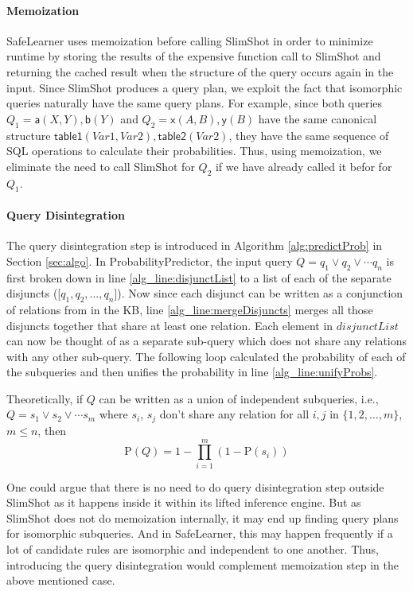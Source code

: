 \documentclass[akbc,twoside,11pt]{article}
\newcounter{example}
\newcommand{\arcchit}[1]{\textcolor{red}{A: {#1}}}
\newcommand{\algorithmname}{SafeLearner\xspace}
\begin{document}
\paragraph{Memoization}
\algorithmname uses memoization before calling SlimShot in order to minimize runtime by storing the results of the expensive function call to SlimShot and returning the cached result when the structure of the query occurs again in the input. Since SlimShot produces a query plan, we exploit the fact that isomorphic queries naturally have the same query plans. For example, since both queries $Q_1 = \mathsf{a}(X,Y),\mathsf{b}(Y)$ and $Q_2 = \mathsf{x}(A,B), \mathsf{y}(B)$ have the same canonical structure $\mathsf{table1}(Var1, Var2), \mathsf{table2}(Var2)$, they have the same sequence of SQL operations to calculate their probabilities. Thus, using memoization, we eliminate the need to call SlimShot for $Q_2$ if we have already called it befor for $Q_1$. 

\paragraph{Query Disintegration} 
The query disintegration step is introduced in Algorithm \ref{alg:predictProb} in Section \ref{sec:algo}. In ProbabilityPredictor, the input query $Q = q_1 \vee q_2 \vee \cdots q_n$ is first broken down in line \ref{alg_line:disjunctList} to a list of each of the separate disjuncts ([$q_1, q_2, \ldots , q_n$]). Now since each disjunct can be written as a conjunction of relations from in the KB, line \ref{alg_line:mergeDisjuncts} merges all those disjuncts together that share at least one relation. Each element in $disjunctList$ can now be thought of as a separate sub-query which does not share any relations with any other sub-query. The following loop calculated the probability of each of the subqueries and then unifies the probability in line \ref{alg_line:unifyProbs}.

Theoretically, if $Q$ can be written as a union of independent subqueries, i.e., 
$Q = s_1 \vee s_2 \vee \cdots s_m$ where $s_i$, $s_j$ don't share any relation for all $i, j$ in $\{1, 2, \ldots, m\}$, $m \leq n$, then\\
\begin{equation}
    \mathrm{P}(Q) = 1 - \prod_{i = 1}^m(1 - \mathrm{P}(s_i))
\end{equation}

One could argue that there is no need to do query disintegration step outside SlimShot as it happens inside it within its lifted inference engine. But as SlimShot does not do memoization internally, it may end up finding query plans for isomorphic subqueries. And in \algorithmname, this may happen frequently if a lot of candidate rules are isomorphic and independent to one another. Thus, introducing the query disintegration would complement memoization step in the above mentioned case.
\end{document}
